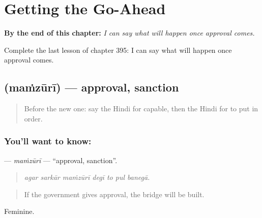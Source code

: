 
\chapter{Getting the Go-Ahead}
\label{ch:hi-getting-the-go-ahead}

\begin{chapteropening}
\textbf{By the end of this chapter:} \emph{I can say what will happen once approval comes.}

Complete the last lesson of chapter 395: I can say what will happen once approval comes.
\end{chapteropening}

\section[\texorpdfstring{\hi{मंज़ूरी} (maṁzūrī)}{मंज़ूरी (maṁzūrī)}]{ (maṁzūrī) — approval, sanction}

\label{lesson:HI-C395-mamzuri}



\begin{quote}
Before the new one: say the Hindi for capable, then the Hindi for to put in order.
\end{quote}

\subsection*{You'll want to know: }
\textbf{} — \emph{maṁzūrī} — \textquotedblleft{}approval, sanction\textquotedblright{}.

\begin{quote}
      
\end{quote}

\begin{quote}
\emph{agar sarkār maṁzūrī degī to pul banegā.}
\end{quote}

\begin{quote}
If the government gives approval, the bridge will be built.
\end{quote}

Feminine.

